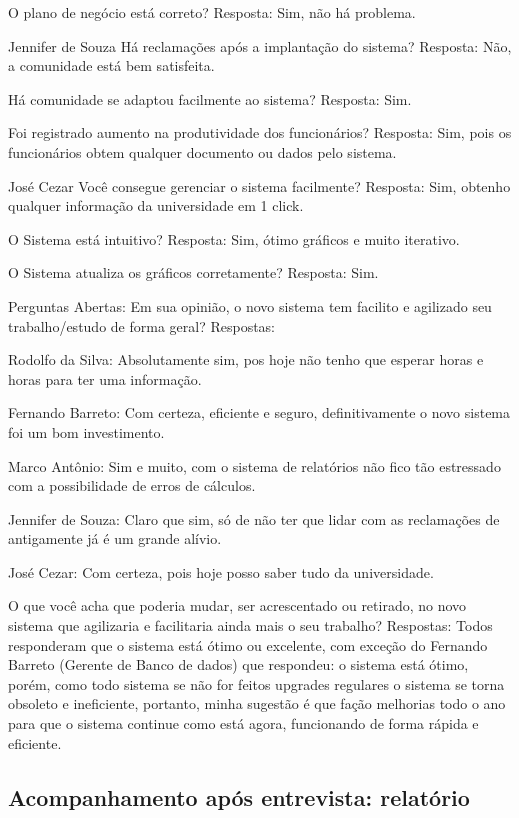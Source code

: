 O plano de negócio está correto?
Resposta: Sim, não há problema.

Jennifer de Souza
Há reclamações após a implantação do sistema?
Resposta: Não, a comunidade está bem satisfeita.

Há comunidade se adaptou facilmente ao sistema?
Resposta: Sim.

Foi registrado aumento na produtividade dos funcionários?
Resposta: Sim, pois os funcionários obtem qualquer documento ou dados pelo sistema.

José Cezar
Você consegue gerenciar o sistema facilmente?
Resposta: Sim, obtenho qualquer informação da universidade em 1 click.

O Sistema está intuitivo?
Resposta: Sim, ótimo gráficos e muito iterativo.

O Sistema atualiza os gráficos corretamente?
Resposta: Sim.

Perguntas Abertas:
Em sua opinião, o novo sistema tem facilito e agilizado seu trabalho/estudo de forma geral?
Respostas:

Rodolfo da Silva: Absolutamente sim, pos hoje não tenho que esperar horas e horas para ter uma informação.

Fernando Barreto: Com certeza, eficiente e seguro, definitivamente o novo sistema foi um bom investimento.

Marco Antônio: Sim e muito, com o sistema de relatórios não fico tão estressado com a possibilidade de erros de cálculos.

Jennifer de Souza: Claro que sim, só de não ter que lidar com as reclamações de antigamente já é um grande alívio.

José Cezar: Com certeza, pois hoje posso saber tudo da universidade.

O que você acha que poderia mudar, ser acrescentado ou retirado, no novo sistema que agilizaria e facilitaria ainda mais o seu trabalho?
Respostas:
Todos responderam que o sistema está ótimo ou excelente, com exceção do Fernando Barreto (Gerente de Banco de dados) que respondeu: o sistema está ótimo, porém, como todo sistema se não for feitos upgrades regulares o sistema se torna obsoleto e ineficiente, portanto, minha sugestão é que fação melhorias todo o ano para que o sistema continue como está agora, funcionando de forma rápida e eficiente.

\subsection{Acompanhamento após entrevista: relatório}

